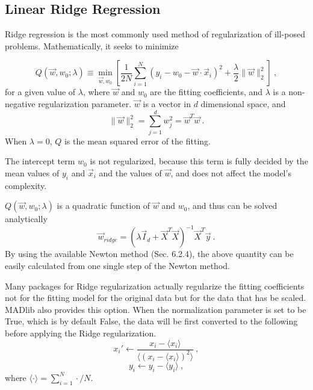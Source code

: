 \subsection{Linear Ridge Regression}
Ridge regression is the most commonly used method of regularization of
ill-posed problems. Mathematically, it seeks to minimize

\begin{equation}
Q\left(\vec{w},w_0;\lambda\right)\equiv \min_{\vec{w},w_0}\left[ \frac{1}{2N} \sum_{i=1}^{N} \left( y_i - w_0 -
    \vec{w} \cdot \vec{x}_i \right)^2
  +\frac{\lambda}{2}\|\vec{w}\|_2^2 \right]\ ,
\end{equation}
for a given value of $\lambda$, where $\vec{w}$ and $w_0$ are the fitting coefficients, and $\lambda$
is a non-negative regularization parameter. $\vec{w}$ is a vector in
$d$ dimensional space, and
\begin{equation}
\|\vec{w}\|_2^2 = \sum_{j=1}^{d}w_j^2 = \vec{w}^T\vec{w}\ .
\end{equation}
When $\lambda = 0$, $Q$ is
the mean squared error of the fitting.

The intercept term $w_0$ is not regularized, because this term is
fully decided by the mean values of $y_i$ and $\vec{x}_i$ and the
values of $\vec{w}$, and does not affect the model's complexity.

$Q\left(\vec{w},w_0;\lambda\right)$ is a quadratic function of $\vec{w}$ and
  $w_0$, and thus can be solved analytically
\begin{equation}
\vec{w}_{ridge}=\left(\lambda\vec{I}_d +
  \vec{X}^T\vec{X}\right)^{-1}\vec{X}^T\vec{y}\ .
\end{equation}
By using the available Newton method (Sec. 6.2.4), the above quantity can be easily
calculated from one single step of the Newton method.

Many packages for Ridge regularization actually regularize the fitting
coefficients not for the fitting model for the original data but for
the data that has be scaled. MADlib also provides this option. When
the normalization parameter is set to be True, which is by default
False, the data will be first converted to the following before
applying the Ridge regularization.
\begin{equation}
  x_i' \leftarrow \frac{x_i - \langle x_i \rangle}{\langle (x_i -
    \langle x_i \rangle)^2\rangle} \ ,
\end{equation}
\begin{equation}
y_i \leftarrow y_i - \langle y_i \rangle \ ,
\end{equation}
where $\langle \cdot \rangle = \sum_{i=1}^{N} \cdot / N$.

